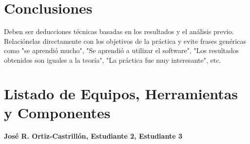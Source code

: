 \documentclass[12pt]{article}
\newcommand{\estudiantes}{José R. Ortiz-Castrillón, Estudiante 2, Estudiante 3}
\begin{document}
\section{Conclusiones}
Deben ser deducciones técnicas basadas en los resultados y el análisis previo. Relaciónelas directamente con los objetivos de la práctica y evite frases genéricas como "se aprendió mucho", "Se aprendió a utilizar el software", "Los resultados obtenidos son iguales a la teoría", "La práctica fue muy interesante", etc.




\newpage

\section*{Listado de Equipos, Herramientas y Componentes}

{\textbf{\estudiantes}}
\end{document}

